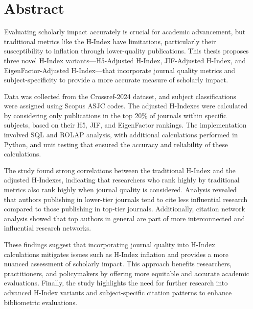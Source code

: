 \chapter*{\centering Abstract}
Evaluating scholarly impact accurately is crucial for academic advancement, but traditional metrics 
like the H-Index have limitations, particularly their susceptibility to inflation through 
lower-quality publications.  This thesis proposes three novel H-Index variants—H5-Adjusted H-Index,
JIF-Adjusted H-Index, and EigenFactor-Adjusted H-Index—that incorporate journal quality metrics
and subject-specificity to provide a more accurate measure of scholarly impact.

Data was collected from the Crossref-2024 dataset, and subject classifications were assigned 
using Scopus ASJC codes. The adjusted H-Indexes were calculated by considering only publications 
in the top 20\% of journals within specific subjects, based on their H5, JIF, and EigenFactor 
rankings. The implementation involved SQL and ROLAP analysis, with additional calculations performed 
in Python, and unit testing that ensured the accuracy and reliability of these calculations.

The study found strong correlations between the traditional H-Index and the adjusted H-Indexes, 
indicating that researchers who rank highly by traditional metrics also rank highly when journal 
quality is considered. Analysis revealed that authors publishing in lower-tier journals tend to 
cite less influential research compared to those publishing in top-tier journals. Additionally, 
citation network analysis showed that top authors in general are part of more interconnected and influential 
research networks.

These findings suggest that incorporating journal quality into H-Index calculations mitigates 
issues such as H-Index inflation and provides a more nuanced assessment of scholarly impact. 
This approach benefits researchers, practitioners, and policymakers by offering more equitable 
and accurate academic evaluations. Finally, the study highlights the need for further research into 
advanced H-Index variants and subject-specific citation patterns to enhance bibliometric evaluations.
